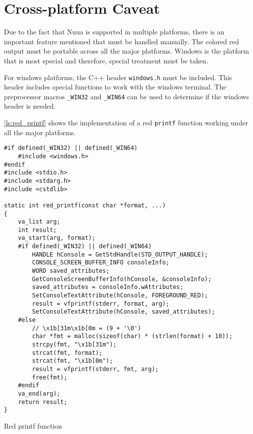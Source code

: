 \section{Cross-platform Caveat}

Due to the fact that Nuua is supported in multiple platforms, there is an important feature mentioned that must be
handled manually. The colored red output must be portable across all the major platforms. Windows is the platform that
is most special and therefore, special treatment must be taken.

For windows platforms, the C++ header \texttt{windows.h} must be included.
This header includes special functions to work with the windows terminal. The preprocessor macros
\texttt{\_WIN32} and \texttt{\_WIN64} can be used to determine if the windows header is needed.

\autoref{ls:red_printf} shows the implementation of a red \texttt{printf} function working under all the major
platforms.

\begin{listing}[H]
\begin{verbatim}
#if defined(_WIN32) || defined(_WIN64)
    #include <windows.h>
#endif
#include <stdio.h>
#include <stdarg.h>
#include <cstdlib>

static int red_printf(const char *format, ...)
{
    va_list arg;
    int result;
    va_start(arg, format);
    #if defined(_WIN32) || defined(_WIN64)
        HANDLE hConsole = GetStdHandle(STD_OUTPUT_HANDLE);
        CONSOLE_SCREEN_BUFFER_INFO consoleInfo;
        WORD saved_attributes;
        GetConsoleScreenBufferInfo(hConsole, &consoleInfo);
        saved_attributes = consoleInfo.wAttributes;
        SetConsoleTextAttribute(hConsole, FOREGROUND_RED);
        result = vfprintf(stderr, format, arg);
        SetConsoleTextAttribute(hConsole, saved_attributes);
    #else
        // \x1b[31m\x1b[0m = (9 + '\0')
        char *fmt = malloc(sizeof(char) * (strlen(format) + 10));
        strcpy(fmt, "\x1b[31m");
        strcat(fmt, format);
        strcat(fmt, "\x1b[0m");
        result = vfprintf(stderr, fmt, arg);
        free(fmt);
    #endif
    va_end(arg);
    return result;
}
\end{verbatim}
\caption{Red printf function}
\label{ls:red_printf}
\end{listing}

